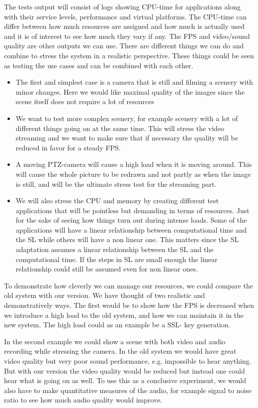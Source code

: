 \documentclass[nobiblatex]{LTHthesis}
\begin{document}
The tests output will consist of logs showing CPU-time for applications along with their service levels, performance and virtual platforms. The CPU-time can differ between how much resources are assigned and how much is actually used and it is of interest to see how much they vary if any. The FPS and video/sound quality are other outputs we can use.
There are different things we can do and combine to stress the system in a realistic perspective. These things could be seen as testing the use cases and can be combined with each other. 

\begin{itemize}

\item The first and simplest case is a camera that is still and filming a scenery with minor changes. Here we would like maximal quality of the images since the scene itself does not require a lot of resources 
\item We want to test more complex scenery, for example scenery with a lot of different things going on at the same time. This will stress the video streaming and we want to make sure that if necessary the quality will be reduced in favor for a steady FPS.
\item A moving PTZ-camera will cause a high load when it is moving around. This will cause the whole picture to be redrawn and not partly as when the image is still, and will be the ultimate stress test for the streaming part.
\item We will also stress the CPU and memory by creating different test applications that will be pointless but demanding in terms of resources. Just for the sake of seeing how things turn out during intense loads. Some of the applications will have a linear relationship between computational time and the SL while others will have a non linear one. This matters since the SL adaptation assumes a linear relationship between the SL and the computational time. If the steps in SL are small enough the linear relationship could still be assumed even for non linear ones.
\end{itemize}
To demonstrate how cleverly we can manage our resources, we could compare the old system with our version. We have thought of two realistic and demonstratively ways. The first would be to show how the FPS is decreased when we introduce a high load to the old system, and how we can maintain it in the new system. The high load could as an example be a SSL- key generation.

In the second example we could show a scene with both video and audio recording while stressing the camera. In the old system we would have great video quality but very poor sound performance, e.g. impossible to hear anything. But with our version the video quality would be reduced but instead one could hear what is going on as well. To use this as a conclusive experiment, we would also have to make quantitative measures of the audio, for example signal to noise ratio to see how much audio quality would improve.
\end{document}
